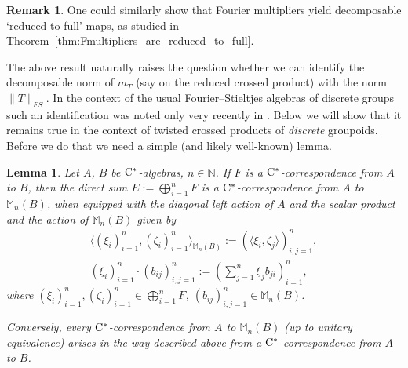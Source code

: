 \documentclass[11 pt, leqno]{amsart}
\numberwithin{equation}{section}
\theoremstyle{plain}
\newtheorem {lem} [thm]{Lemma}
\theoremstyle{definition}
\newtheorem {rem} [thm]{Remark}
\newcommand{\Mat}{\mathbb M} %
\newcommand{\m}{m}
\newcommand{\N}{\mathbb N}
\newcommand{\cst}{\ifmmode\mathrm{C}^*\else{$\mathrm{C}^*$}\fi}
\begin{document}
\begin{rem}
One could similarly show that Fourier multipliers yield decomposable `reduced-to-full' maps, as studied in Theorem~\ref{thm:Fmultipliers_are_reduced_to_full}.
\end{rem}

The above result naturally raises the question whether we can identify the decomposable norm of $\m_T$ (say on the reduced crossed product) with the norm $\|T\|_{FS}$. 
In the context of the usual Fourier--Stieltjes algebras of discrete groups such an identification was noted only very recently in \cite{ArhancetKriegler}. 
Below we will show that it remains true in the context of twisted crossed products of \emph{discrete} groupoids. 
Before we do that we need a simple (and likely well-known) lemma.

\begin{lem}\label{lem:matrixcorrespondences}
Let $A$, $B$ be $\cst$-algebras, $n \in \N$. 
If $F$ is a $\cst$-correspondence from $A$ to $B$, then the direct sum $E := \bigoplus_{i=1}^n F$ is a $\cst$-correspondence from $A$ to $\Mat_n(B)$, when equipped with the diagonal left action of $A$ and the scalar product and the action of $\Mat_n(B)$ given by 
\[
\begin{gathered}
    \big\langle (\xi_i)_{i=1}^n , (\zeta_i)_{i=1}^n \big\rangle_{\Mat_n(B)} := \left( \langle \xi_i, \zeta_j\rangle \right)_{i,j=1}^n , \\
    (\xi_i)_{i=1}^n \cdot \left( b_{ij}\right)_{i,j=1}^n := \left( \sum_{j=1}^n \xi_j b_{ji} \right)_{i=1}^n, 
\end{gathered}
\]
where $(\xi_i)_{i=1}^n, (\zeta_i)_{i=1}^n \in \bigoplus_{i=1}^n F$, $\left( b_{ij}\right)_{i,j=1}^n \in \Mat_n(B)$.
	
Conversely, every $\cst$-correspondence from $A$ to $\Mat_n(B)$ (up to unitary equivalence) arises in the way described above from a  $\cst$-correspondence from $A$ to $B$.  
\end{lem}
\end{document}
